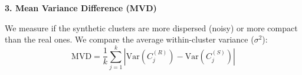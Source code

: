 \textbf{3. Mean Variance Difference (MVD)}

We measure if the synthetic clusters are more dispersed (noisy) or more compact than the real ones. We compare the average within-cluster variance ($\sigma^2$):
\begin{equation}
  \text{MVD} = \frac{1}{k} \sum_{j=1}^{k} \left| \text{Var}(C_j^{(R)}) - \text{Var}(C_j^{(S)}) \right|
\end{equation}
